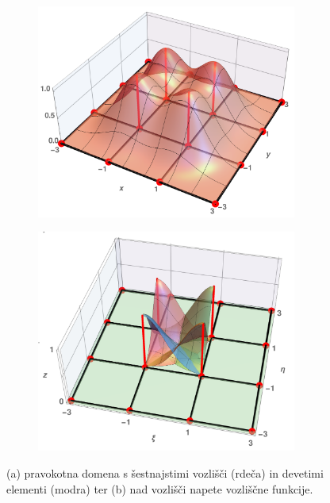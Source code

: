 \begin{figure}[ht]
    \begin{subfigure}[b]{0.48\textwidth}
        \centering
        \includegraphics[width=0.94\textwidth]{Slike/sumOfNodeFs.png}
        \vspace{6mm}
        \caption{}
    \end{subfigure}
    \begin{subfigure}[b]{0.48\textwidth}
        \centering
        \includegraphics[width=0.94\textwidth]{Slike/undeformedShapeFsFar.png}
        \caption{}
    \end{subfigure}
    \caption{(a) pravokotna domena s šestnajstimi vozlišči (rdeča) in devetimi elementi (modra) ter (b) nad vozlišči napete vozliščne funkcije.}
    \label{fig:sumAndShapeFunctions}
\end{figure}

